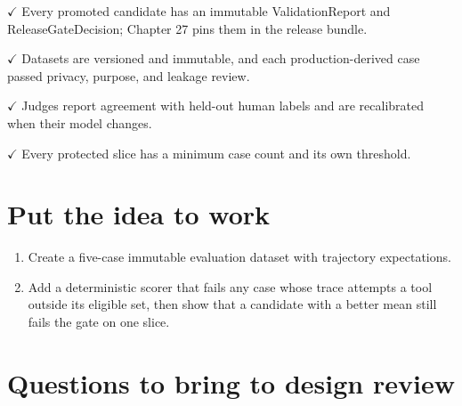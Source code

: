 \textbf{\ensuremath{\checkmark}} Every promoted candidate has an immutable ValidationReport and ReleaseGateDecision; Chapter 27 pins them in the release bundle.\par

\textbf{\ensuremath{\checkmark}} Datasets are versioned and immutable, and each production-derived case passed privacy, purpose, and leakage review.\par

\textbf{\ensuremath{\checkmark}} Judges report agreement with held-out human labels and are recalibrated when their model changes.\par

\textbf{\ensuremath{\checkmark}} Every protected slice has a minimum case count and its own threshold.\par

\section{Put the idea to work}

\begin{enumerate}

\item Create a five-case immutable evaluation dataset with trajectory expectations.

\item Add a deterministic scorer that fails any case whose trace attempts a tool outside its eligible set, then show that a candidate with a better mean still fails the gate on one slice.

\end{enumerate}

\section{Questions to bring to design review}

